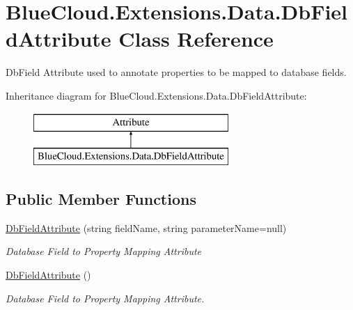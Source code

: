 \hypertarget{class_blue_cloud_1_1_extensions_1_1_data_1_1_db_field_attribute}{}\section{Blue\+Cloud.\+Extensions.\+Data.\+Db\+Field\+Attribute Class Reference}
\label{class_blue_cloud_1_1_extensions_1_1_data_1_1_db_field_attribute}


Db\+Field Attribute used to annotate properties to be mapped to database fields.  


Inheritance diagram for Blue\+Cloud.\+Extensions.\+Data.\+Db\+Field\+Attribute\+:\begin{figure}[H]
\begin{center}
\leavevmode
\includegraphics[height=2.000000cm]{class_blue_cloud_1_1_extensions_1_1_data_1_1_db_field_attribute}
\end{center}
\end{figure}
\subsection*{Public Member Functions}
\begin{DoxyCompactItemize}
\item 
\mbox{\hyperlink{class_blue_cloud_1_1_extensions_1_1_data_1_1_db_field_attribute_a215a03bd00877393b57b061cbf6fdc85}{Db\+Field\+Attribute}} (string field\+Name, string parameter\+Name=null)
\begin{DoxyCompactList}\small\item\em Database Field to Property Mapping Attribute \end{DoxyCompactList}\item 
\mbox{\hyperlink{class_blue_cloud_1_1_extensions_1_1_data_1_1_db_field_attribute_ab2236b1aa5c73e738bd5eae507aeb3e5}{Db\+Field\+Attribute}} ()
\begin{DoxyCompactList}\small\item\em Database Field to Property Mapping Attribute. \end{DoxyCompactList}\end{DoxyCompactItemize}
